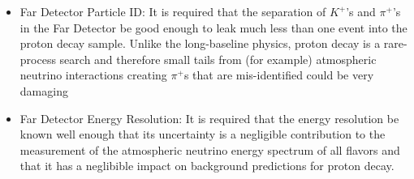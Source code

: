 \begin{itemize}
\item Far Detector Particle ID: It is required that the separation
  of $K^+$'s and $\pi^+$'s in the Far Detector be good enough to leak
  much less than one event into the proton decay sample.  Unlike the
  long-baseline physics, proton decay is a rare-process search and
  therefore small tails from (for example) atmospheric neutrino
  interactions creating $\pi^+$s that are mis-identified could be very
  damaging

\item Far Detector Energy Resolution: It is required that the energy
  resolution be known well enough that its uncertainty is a negligible
  contribution to the measurement of the atmospheric neutrino energy
  spectrum of all flavors and that it has a neglibible impact on
  background predictions for proton decay.

\end{itemize}



